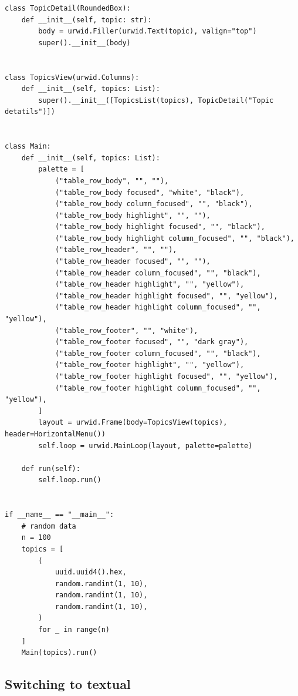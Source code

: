 \documentclass[10pt , a4paper]{report}
\newenvironment{code}{\captionsetup{type=listing}}{}
\begin{document}
\begin{code}
\begin{verbatim}
class TopicDetail(RoundedBox):
    def __init__(self, topic: str):
        body = urwid.Filler(urwid.Text(topic), valign="top")
        super().__init__(body)


class TopicsView(urwid.Columns):
    def __init__(self, topics: List):
        super().__init__([TopicsList(topics), TopicDetail("Topic detatils")])


class Main:
    def __init__(self, topics: List):
        palette = [
            ("table_row_body", "", ""),
            ("table_row_body focused", "white", "black"),
            ("table_row_body column_focused", "", "black"),
            ("table_row_body highlight", "", ""),
            ("table_row_body highlight focused", "", "black"),
            ("table_row_body highlight column_focused", "", "black"),
            ("table_row_header", "", ""),
            ("table_row_header focused", "", ""),
            ("table_row_header column_focused", "", "black"),
            ("table_row_header highlight", "", "yellow"),
            ("table_row_header highlight focused", "", "yellow"),
            ("table_row_header highlight column_focused", "", "yellow"),
            ("table_row_footer", "", "white"),
            ("table_row_footer focused", "", "dark gray"),
            ("table_row_footer column_focused", "", "black"),
            ("table_row_footer highlight", "", "yellow"),
            ("table_row_footer highlight focused", "", "yellow"),
            ("table_row_footer highlight column_focused", "", "yellow"),
        ]
        layout = urwid.Frame(body=TopicsView(topics), header=HorizontalMenu())
        self.loop = urwid.MainLoop(layout, palette=palette)

    def run(self):
        self.loop.run()


if __name__ == "__main__":
    # random data
    n = 100
    topics = [
        (
            uuid.uuid4().hex,
            random.randint(1, 10),
            random.randint(1, 10),
            random.randint(1, 10),
        )
        for _ in range(n)
    ]
    Main(topics).run()
  \end{verbatim}
\end{code}



\subsection{Switching to textual}


\appendix
\end{document}
